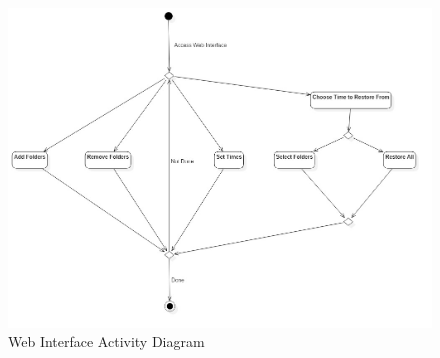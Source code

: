 \begin{figure}[h]
	\centering

\includegraphics[scale=0.45]{images/ActivityDiagram1.jpg}
	\caption{Web Interface Activity Diagram}
	\label{fig:activitydiagram}
\end{figure}